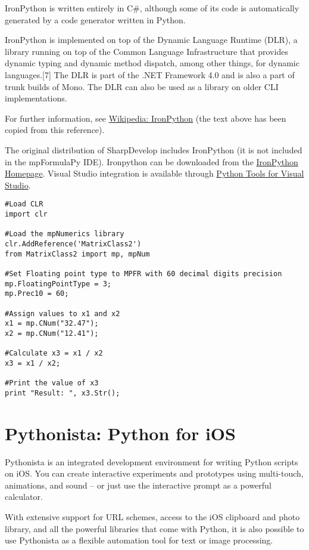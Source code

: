 IronPython is written entirely in C\#, although some of its code is automatically generated by a code generator written in Python.

IronPython is implemented on top of the Dynamic Language Runtime (DLR), a library running on top of the Common Language Infrastructure that provides dynamic typing and dynamic method dispatch, among other things, for dynamic languages.[7] The DLR is part of the .NET Framework 4.0 and is also a part of trunk builds of Mono. The DLR can also be used as a library on older CLI implementations.

For further information, see \href{http://en.wikipedia.org/wiki/IronPython}{Wikipedia: IronPython} (the text above has been copied from this reference).

The original distribution of SharpDevelop includes IronPython (it is not included in the mpFormulaPy IDE). Ironpython can be downloaded from the 
\href{http://ironpython.net/}{IronPython Homepage}. Visual Studio integration is available through  \href{http://ironpython.net/tools/}{Python Tools for Visual Studio}.


\begin{lstlisting}
#Load CLR
import clr

#Load the mpNumerics library
clr.AddReference('MatrixClass2')
from MatrixClass2 import mp, mpNum

#Set Floating point type to MPFR with 60 decimal digits precision
mp.FloatingPointType = 3;
mp.Prec10 = 60;

#Assign values to x1 and x2
x1 = mp.CNum("32.47");
x2 = mp.CNum("12.41");

#Calculate x3 = x1 / x2
x3 = x1 / x2;

#Print the value of x3
print "Result: ", x3.Str();
\end{lstlisting}




\newpage
\section{Pythonista: Python for iOS}

Pythonista is an integrated development environment for writing Python scripts on iOS. You can create interactive experiments and prototypes using multi-touch, animations, and sound – or just use the interactive prompt as a powerful calculator.

With extensive support for URL schemes, access to the iOS clipboard and photo library, and all the powerful libraries that come with Python, it is also possible to use Pythonista as a flexible automation tool for text or image processing.

